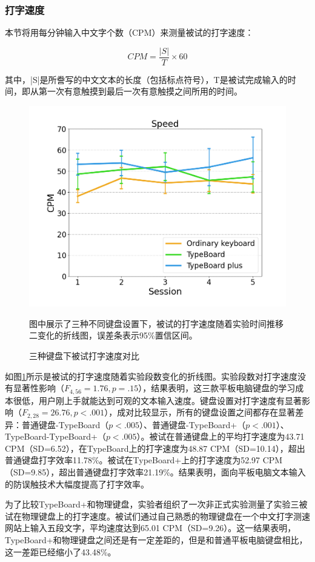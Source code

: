 \subsubsection{打字速度}

本节将用每分钟输入中文字个数（CPM）来测量被试的打字速度：

\begin{equation}
	CPM = \frac{|S|}{T} \times 60
\end{equation}

其中，|S|是所誊写的中文文本的长度（包括标点符号），T是被试完成输入的时间，即从第一次有意触摸到最后一次有意触摸之间所用的时间。

\begin{figure}[!tbh]
 	\includegraphics[width=0.7\linewidth]{figures/TypeBoard_speed.png}
	\centering
	\caption*{图中展示了三种不同键盘设置下，被试的打字速度随着实验时间推移二变化的折线图，误差条表示95\%置信区间。}
	\caption{三种键盘下被试打字速度对比}
	\label{fig:TypeBoard_speed}
\end{figure}

如图\ref{fig:TypeBoard_speed}所示是被试的打字速度随着实验段数变化的折线图。实验段数对打字速度没有显著性影响（$F_{4,56}=1.76,p=.15$），结果表明，这三款平板电脑键盘的学习成本很低，用户刚上手就能达到可观的文本输入速度。键盘设置对打字速度有显著影响（$F_{2,28}=26.76,p<.001$），成对比较显示，所有的键盘设置之间都存在显著差异：普通键盘-TypeBoard（$p<.005$）、普通键盘-TypeBoard+（$p<.001$）、TypeBoard-TypeBoard+（$p<.005$）。被试在普通键盘上的平均打字速度为43.71 CPM（SD=6.52），在TypeBoard上的打字速度为48.87 CPM（SD=10.14），超出普通键盘打字效率11.78\%。被试在TypeBoard+上的打字速度为52.97 CPM（SD=9.85），超出普通键盘打字效率21.19\%。结果表明，面向平板电脑文本输入的防误触技术大幅度提高了打字效率。

为了比较TypeBoard+和物理键盘，实验者组织了一次非正式实验测量了实验三被试在物理键盘上的打字速度。被试们通过自己熟悉的物理键盘在一个中文打字测速网站上输入五段文字\cite{Website-Typing}，平均速度达到65.01 CPM（SD=9.26）。这一结果表明，TypeBoard+和物理键盘之间还是有一定差距的，但是和普通平板电脑键盘相比，这一差距已经缩小了43.48\%。

